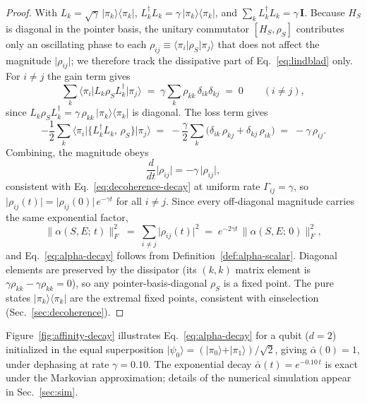 \begin{proof}
With $L_k = \sqrt{\gamma}\,\vert\pi_k\rangle\langle\pi_k\vert$,
$L_k^\dagger L_k = \gamma\,\vert\pi_k\rangle\langle\pi_k\vert$, and
$\sum_k L_k^\dagger L_k = \gamma\,\mathbf{I}$.
Because $H_S$ is diagonal in the pointer basis, the unitary commutator
$[H_S,\rho_S]$ contributes only an oscillating phase to each
$\rho_{ij}\equiv\langle\pi_i\vert\rho_S\vert\pi_j\rangle$ that does not
affect the magnitude $\lvert\rho_{ij}\rvert$; we therefore track the
dissipative part of Eq.~\eqref{eq:lindblad} only.
For $i\neq j$ the gain term gives
\begin{equation*}
  \sum_k\langle\pi_i\vert L_k\rho_S L_k^\dagger\vert\pi_j\rangle
  \;=\;
  \gamma\sum_k \rho_{kk}\,\delta_{ik}\delta_{kj}
  \;=\; 0
  \qquad (i \neq j),
\end{equation*}
since $L_k\rho_S L_k^\dagger = \gamma\,\rho_{kk}\,\vert\pi_k\rangle\langle\pi_k\vert$
is diagonal.
The loss term gives
\begin{equation*}
  -\frac{1}{2}\sum_k\!
  \langle\pi_i\vert\{L_k^\dagger L_k,\,\rho_S\}\vert\pi_j\rangle
  \;=\;
  -\frac{\gamma}{2}\sum_k\!\bigl(\delta_{ik}\,\rho_{kj}
    + \delta_{kj}\,\rho_{ik}\bigr)
  \;=\; -\gamma\,\rho_{ij}.
\end{equation*}
Combining, the magnitude obeys
\begin{equation*}
  \frac{d}{dt}\lvert\rho_{ij}\rvert = -\gamma\,\lvert\rho_{ij}\rvert,
\end{equation*}
consistent with Eq.~\eqref{eq:decoherence-decay} at uniform rate
$\Gamma_{ij} = \gamma$, so
$\lvert\rho_{ij}(t)\rvert = \lvert\rho_{ij}(0)\rvert\,e^{-\gamma t}$ for
all $i \neq j$.
Since every off-diagonal magnitude carries the same exponential factor,
\begin{equation*}
  \bigl\lVert\alpha(S,E;\,t)\bigr\rVert_F^2
  \;=\; \sum_{i\neq j}\bigl\lvert\rho_{ij}(t)\bigr\rvert^2
  \;=\; e^{-2\gamma t}\,
        \bigl\lVert\alpha(S,E;\,0)\bigr\rVert_F^2,
\end{equation*}
and Eq.~\eqref{eq:alpha-decay} follows from
Definition~\ref{def:alpha-scalar}.
Diagonal elements are preserved by the dissipator (its $(k,k)$ matrix
element is $\gamma\rho_{kk}-\gamma\rho_{kk}=0$), so any pointer-basis-diagonal
$\rho_S$ is a fixed point.
The pure states $\vert\pi_k\rangle\langle\pi_k\vert$ are the extremal
fixed points, consistent with einselection (Sec.~\ref{sec:decoherence}).
\end{proof}

\begin{remark}
Figure~\ref{fig:affinity-decay} illustrates Eq.~\eqref{eq:alpha-decay}
for a qubit ($d = 2$) initialized in the equal superposition
$\vert\psi_0\rangle = (\vert\pi_0\rangle + \vert\pi_1\rangle)/\sqrt{2}$,
giving $\bar{\alpha}(0) = 1$, under dephasing at rate $\gamma = 0.10$.
The exponential decay $\bar{\alpha}(t) = e^{-0.10\,t}$ is exact under
the Markovian approximation; details of the numerical simulation appear
in Sec.~\ref{sec:sim}.
\end{remark}

